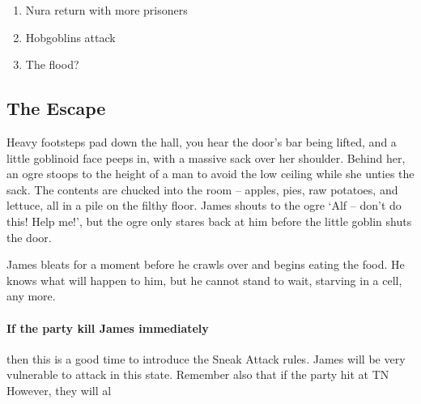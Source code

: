 \begin{multicols}{2}

\begin{enumerate}

	\item{Nura return with more prisoners}
	\item{Hobgoblins attack}
	\item{The flood?}

\end{enumerate}

\subsection{The Escape}
\label{escape}

\begin{boxtext}

	Heavy footsteps pad down the hall, you hear the door's bar being lifted, and a little goblinoid face peeps in, with a massive sack over her shoulder.
	Behind her, an ogre stoops to the height of a man to avoid the low ceiling while she unties the sack.
	The contents are chucked into the room -- apples, pies, raw potatoes, and lettuce, all in a pile on the filthy floor.
	James shouts to the ogre `Alf -- don't do this! Help me!', but the ogre only stares back at him before the little goblin shuts the door.

\end{boxtext}

James bleats for a moment before he crawls over and begins eating the food.
He knows what will happen to him, but he cannot stand to wait, starving in a cell, any more.

\paragraph{If the party kill James immediately}
then this is a good time to introduce the Sneak Attack rules.
James will be very vulnerable to attack in this state.
Remember also that if the party hit at TN 
However, they will al




\end{multicols}
